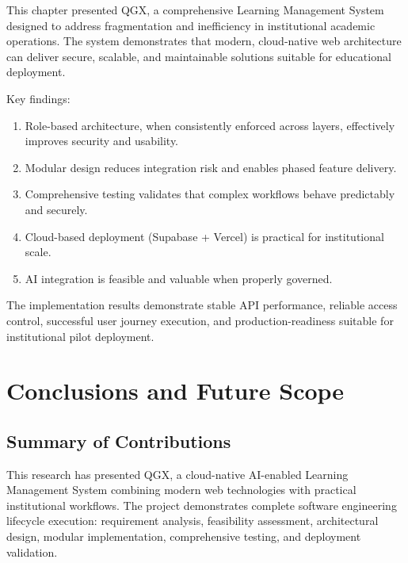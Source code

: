 \documentclass[11pt,a4paper]{article}
\begin{document}
This chapter presented QGX, a comprehensive Learning Management System designed to address fragmentation and inefficiency in institutional academic operations. The system demonstrates that modern, cloud-native web architecture can deliver secure, scalable, and maintainable solutions suitable for educational deployment.

Key findings:

\begin{enumerate}
    \item Role-based architecture, when consistently enforced across layers, effectively improves security and usability.
    \item Modular design reduces integration risk and enables phased feature delivery.
    \item Comprehensive testing validates that complex workflows behave predictably and securely.
    \item Cloud-based deployment (Supabase + Vercel) is practical for institutional scale.
    \item AI integration is feasible and valuable when properly governed.
\end{enumerate}

The implementation results demonstrate stable API performance, reliable access control, successful user journey execution, and production-readiness suitable for institutional pilot deployment.


\newpage
\section{Conclusions and Future Scope}

\subsection{Summary of Contributions}

This research has presented QGX, a cloud-native AI-enabled Learning Management System combining modern web technologies with practical institutional workflows. The project demonstrates complete software engineering lifecycle execution: requirement analysis, feasibility assessment, architectural design, modular implementation, comprehensive testing, and deployment validation.
\end{document}
